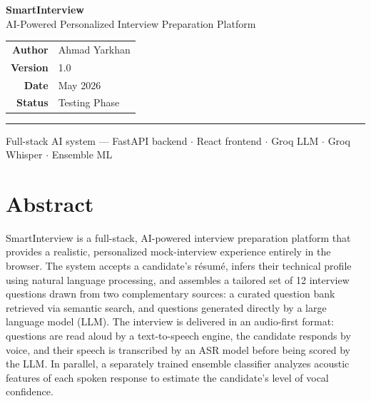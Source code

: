\documentclass[12pt,a4paper]{article}
\begin{document}
\begin{titlepage}
  \centering
  \vspace*{3cm}
  {\Huge\bfseries\color{accentdark} SmartInterview}\\[0.5em]
  {\large\color{accent} AI-Powered Personalized Interview Preparation Platform}\\[3cm]

  \begin{tabular}{rl}
    \textbf{Author}   & Ahmad Yarkhan \\[4pt]
    \textbf{Version}  & 1.0 \\[4pt]
    \textbf{Date}     & May 2026 \\[4pt]
    \textbf{Status}   & Testing Phase \\[4pt]
  \end{tabular}

  \vfill
  \hrule\vspace{8pt}
  {\small\color{gray}
    Full-stack AI system --- FastAPI backend $\cdot$ React frontend $\cdot$
    Groq LLM $\cdot$ Groq Whisper $\cdot$ Ensemble ML
  }
\end{titlepage}

\tableofcontents
\newpage

\section{Abstract}

SmartInterview is a full-stack, AI-powered interview preparation platform that provides a realistic, personalized mock-interview experience entirely in the browser. The system accepts a candidate's r\'esum\'e, infers their technical profile using natural language processing, and assembles a tailored set of 12 interview questions drawn from two complementary sources: a curated question bank retrieved via semantic search, and questions generated directly by a large language model (LLM). The interview is delivered in an audio-first format: questions are read aloud by a text-to-speech engine, the candidate responds by voice, and their speech is transcribed by an ASR model before being scored by the LLM. In parallel, a separately trained ensemble classifier analyzes acoustic features of each spoken response to estimate the candidate's level of vocal confidence.
\end{document}
